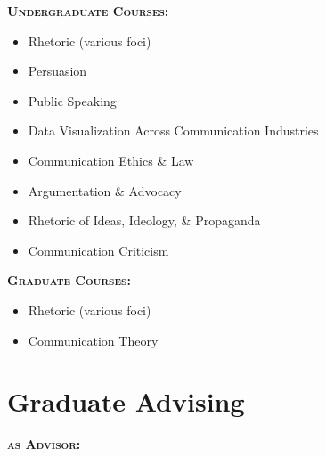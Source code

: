 \documentclass[10pt, a4paper]{article}
\begin{document}
\textbf{\textsc{Undergraduate Courses:}}

\noindent
\begin{itemize}[noitemsep]
    \item Rhetoric (various foci)
    \item Persuasion
    \item Public Speaking
    \item Data Visualization Across Communication Industries
    \item Communication Ethics \& Law
    \item Argumentation \& Advocacy
    \item Rhetoric of Ideas, Ideology, \& Propaganda
    \item Communication Criticism
\end{itemize}

\textbf{\textsc{Graduate Courses:}}

\noindent
\begin{itemize}[noitemsep]
    \item Rhetoric (various foci)
    \item Communication Theory
\end{itemize}



\section*{Graduate Advising}

\textbf{\textsc{as Advisor:}}
\end{document}
